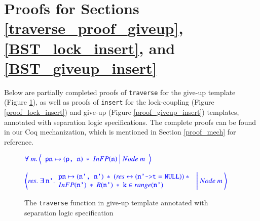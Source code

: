 \documentclass[a4paper,UKenglish,cleveref, autoref, thm-restate]{lipics-v2021}
\newcommand{\treerep}{\ensuremath{\mathsf{Node}}}
\newcommand{\infp}{\ensuremath{\mathsf{InFP}}}
\begin{document}


\newpage
\appendix

\section{Proofs for Sections \ref{traverse_proof_giveup}, \ref{BST_lock_insert}, and \ref{BST_giveup_insert}}
\label{sec:apd_proof}
Below are partially completed proofs of \texttt{traverse} for the give-up template (Figure \ref{proof_giveup_traverse}), as well as proofs of \texttt{insert} for the lock-coupling (Figure \ref{proof_lock_insert}) and give-up (Figure \ref{proof_giveup_insert}) templates, annotated with separation logic specifications. The complete proofs can be found in our Coq mechanization, which is mentioned in Section \ref{proof_mech} for reference.

\begin{figure}[!ht]
	$\color{blue}
	\forall \  m. \left\langle
	\begin{array}{c}
		\texttt{pn} \mapsto (\texttt{p, n}) \ \ast \ \infp (\texttt{n}) \ \big| \ \treerep\ m
	\end{array}
	\right\rangle$
		
	$\color{blue}
	\left\langle \mathit{res}. \ \exists \ \texttt{n'}.
	\begin{array}{l}
		\texttt{pn} \mapsto (\texttt{n', n'}) \ \ast \ (\mathit{res} \leftrightarrow (\texttt{n'->t} = \texttt{NULL}))  \ \ast \ 
		\\ \infp(\texttt{n'}) \ \ast \ \mathsf{R}(\texttt{n'}) \ \ast \ \texttt{k} \in \mathsf{range}(\texttt{n'})
	\end{array}
	\ \Bigg| \ \treerep\ m \
	\right\rangle$
	\caption{The \texttt{traverse} function in give-up template annotated with separation logic specification}
	\label{proof_giveup_traverse}
\end{figure}
\end{document}
